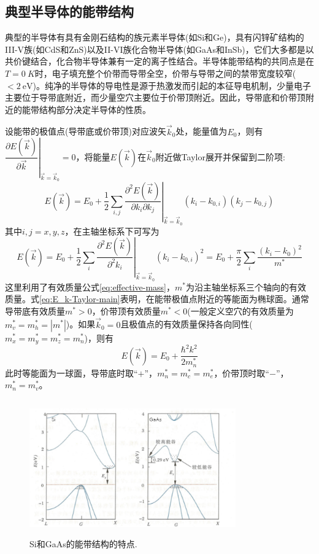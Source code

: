 \subsection{典型半导体的能带结构} 
典型的半导体有具有金刚石结构的族元素半导体(如Si和Ge)，具有闪锌矿结构的III-V族(如CdS和ZnS)以及II-VI族化合物半导体(如GaAs和InSb)，它们大多都是以共价键结合，化合物半导体兼有一定的离子性结合。半导体能带结构的共同点是在$T=0~K$时，电子填充整个价带而导带全空，价带与导带之间的禁带宽度较窄($<\!2~\mathrm{eV}$)。纯净的半导体的导电性是源于热激发而引起的本征导电机制，少量电子主要位于导带底附近，而少量空穴主要位于价带顶附近。因此，导带底和价带顶附近的能带结构部分决定半导体的性质。

设能带的极值点(导带底或价带顶)对应波矢$\vec k_0$处，能量值为$E_0$，则有$\left.\dfrac{\partial E(\vec k)}{\partial\vec k}\right|_{\vec k=\vec k_0}=0$，将能量$E(\vec k)$在$\vec k_0$附近做Taylor展开并保留到二阶项:
\begin{equation}
	E(\vec k)=E_0+\dfrac12\sum_{i,j}\left.\dfrac{\partial^2E(\vec k)}{\partial k_i\partial k_j}\right|_{\vec k=\vec k_0}(k_i-k_{0,i})(k_j-k_{0,j})
	\label{eq:E_k-Taylor}
\end{equation}
其中$i, j=x, y, z$，在主轴坐标系下可写为
\begin{equation}
	E(\vec k)=E_0+\dfrac12\sum_{i}\left.\dfrac{\partial^2E(\vec k)}{\partial^2 k_i}\right|_{\vec k=\vec k_0}(k_i-k_{0,i})^2=E_0+\dfrac{\pi}2\sum_i\dfrac{(k_i-k_0)^2}{m^{\ast}}
	\label{eq:E_k-Taylor-main}
\end{equation}
这里利用了有效质量公式\eqref{eq:effective-mass}，$m^{\ast}$为沿主轴坐标系三个轴向的有效质量。式\eqref{eq:E_k-Taylor-main}表明，在能带极值点附近的等能面为椭球面。通常导带底有效质量$m^{\ast}>0$，价带顶有效质量$m^{\ast}<0$(一般定义空穴的有效质量为$m_v^{\ast}=m_h^{\ast}=|m^{\ast}|$)。如果$\vec k_0=0$且极值点的有效质量保持各向同性($m_x^{\ast}=m_y^{\ast}=m_z^{\ast}=m_n^{\ast}$)，则有
\begin{equation}
	E(\vec k)=E_0+\dfrac{\hbar^2k^2}{2m_n^{\ast}}
	\label{eq:E_Taylor-isotropic}
\end{equation}
此时等能面为一球面，导带底时取``$+$''，$m_n^{\ast}=m_c^{\ast}=m_e^{\ast}$，价带顶时取``$-$''，$m_n^{\ast}=m_v^{\ast}$。
\begin{figure}[h!]
\centering
\vspace*{-0.10in}
\includegraphics[height=2.30in,width=3.50in,viewport=0 0 100 60,clip]{Figures/Band_Structure-Si-GaAs.png}
\caption{\small \textrm{Si和GaAs的能带结构的特点.}}%
\label{Fig:Band_Structure-Si-GaAs}
\end{figure}

